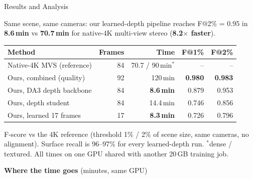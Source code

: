 \documentclass{article}
\newcommand{\bodysize}{\fontsize{16}{21}\selectfont}
\newcommand{\smallsize}{\fontsize{13.5}{17}\selectfont}
\newcommand{\subhead}[1]{{\color{iitmaroon}\bfseries #1}}
\begin{document}
\begin{minipage}[t]{0.488\textwidth}\vspace{0pt}
\begin{posterblock}{}{Results and Analysis}
\begin{keybox}
Same scene, same cameras: our learned-depth pipeline reaches F@2\% = 0.95
in \textbf{8.6\,min} vs \textbf{70.7\,min} for native-4K multi-view stereo (\textbf{8.2$\times$ faster}).
\end{keybox}
\centering
{\bodysize
\renewcommand{\arraystretch}{1.12}\setlength{\tabcolsep}{5pt}
\begin{tabular}{@{}lrrrr@{}}
  \toprule
  \textbf{Method} & \textbf{Frames} & \textbf{Time} & \textbf{F@1\%} & \textbf{F@2\%}\\
  \midrule
  Native-4K MVS (reference) & 84 & 70.7 / 90\,min$^\ast$ & -- & -- \\
  Ours, combined (quality) & 92 & 120\,min & \textbf{0.980} & \textbf{0.983}\\
  Ours, DA3 depth backbone & 84 & \textbf{8.6\,min} & 0.879 & 0.953\\
  Ours, depth student & 84 & 14.4\,min & 0.746 & 0.856\\
  Ours, learned 17 frames & 17 & \textbf{8.3\,min} & 0.726 & 0.796\\
  \bottomrule
\end{tabular}\par}
\vspace{4pt}\raggedright
{\smallsize\color{iitgray}F-score vs the 4K reference (threshold 1\% / 2\% of scene size, same cameras,
no alignment). Surface recall is 96--97\% for every learned-depth run. $^\ast$dense / textured.
All times on one GPU shared with another 20\,GB training job.\par}
\vspace{0.4em}
\subhead{Where the time goes} {\smallsize\color{iitgray}(minutes, same GPU)}\\[0.2em]
\end{posterblock}


\end{minipage}
\end{document}
